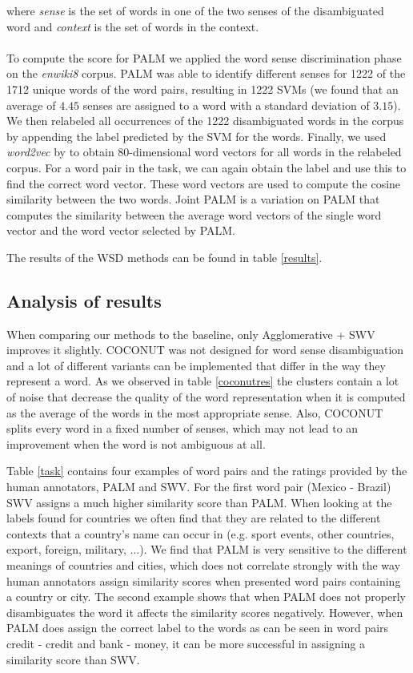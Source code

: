 \documentclass[11pt]{article}
\begin{document}
where \textit{sense} is the set of words in one of the two senses of the disambiguated word and \textit{context} is the set of words in the context.\\\\
To compute the score for PALM we applied the word sense discrimination phase on the \textit{enwiki8} corpus. PALM was able to identify different senses for 1222 of the 1712 unique words of the word pairs, resulting in 1222 SVMs  (we found that an average of $4.45$ senses are assigned to a word with a standard deviation of $3.15$). We then relabeled all occurrences of the 1222 disambiguated words in the corpus by appending the label predicted by the SVM for the words. Finally, we used \textit{word2vec} by \cite{word2vec} to obtain 80-dimensional word vectors for all words in the relabeled corpus. For a word pair in the task, we can again obtain the label and use this to find the correct word vector. These word vectors are used to compute the cosine similarity between the two words. Joint PALM is a variation on PALM that computes the similarity between the average word vectors of the single word vector and the word vector selected by PALM.

The results of the WSD methods can be found in table \ref{results}.

\subsection{Analysis of results}
When comparing our methods to the baseline, only Agglomerative + SWV improves it slightly. COCONUT was not designed for word sense disambiguation and a lot of different variants can be implemented that differ in the way they represent a word. As we observed in table \ref{coconutres} the clusters contain a lot of noise that decrease the quality of the word representation when it is computed as the average of the words in the most appropriate sense. Also, COCONUT splits every word in a fixed number of senses, which may not lead to an improvement when the word is not ambiguous at all. 

Table \ref{task} contains four examples of word pairs and the ratings provided by the human annotators, PALM and SWV. For the first word pair (Mexico - Brazil) SWV assigns a much higher similarity score than PALM. When looking at the labels found for countries we often find that they are related to the different contexts that a country's name can occur in (e.g. sport events, other countries, export, foreign, military, $\dots$). We find that PALM is very sensitive to the different meanings of countries and cities, which does not correlate strongly with the way human annotators assign similarity scores when presented word pairs containing a country or city. The second example shows that when PALM does not properly disambiguates the word it affects the similarity scores negatively. However, when PALM does assign the correct label to the words as can be seen in word pairs credit - credit and bank - money, it can be more successful in assigning a similarity score than SWV.
\end{document}
